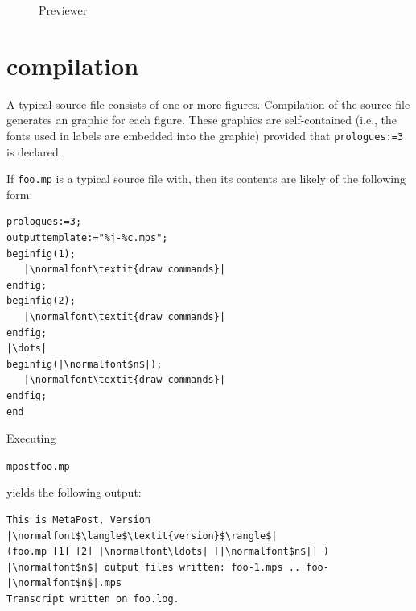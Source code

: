 \begin{figure}
	\begin{center}
		\caption{\MP{} Previewer}\label{fig:previewer}
	\end{center}
\end{figure}

\section{\MP{} compilation}
\label{sec:mpcompilation}

A typical \MP{} source file consists of one or more figures.
Compilation of the source file generates an \EPS{} graphic for each
figure.  These \EPS{} graphics are self-contained (i.e., the fonts used
in labels are embedded into the graphic) provided that
\lstinline{prologues:=3} is declared.

If \texttt{foo.mp} is a typical \MP{} source file with, then its
contents are likely of the following form:

\begin{lstlisting}[xleftmargin=1.25\parindent]
prologues:=3;
outputtemplate:="%j-%c.mps";
beginfig(1);
   |\normalfont\textit{draw commands}|
endfig;
beginfig(2);
   |\normalfont\textit{draw commands}|
endfig;
|\dots|
beginfig(|\normalfont$n$|);
   |\normalfont\textit{draw commands}|
endfig;
end
\end{lstlisting}

Executing
\begin{flushleft}
  \hspace*{1.25\parindent}\texttt{mpostfoo.mp}
\end{flushleft}
 yields the following output:

\begin{lstlisting}[xleftmargin=1.25\parindent]
This is MetaPost, Version |\normalfont$\langle$\textit{version}$\rangle$|
(foo.mp [1] [2] |\normalfont\ldots| [|\normalfont$n$|] )
|\normalfont$n$| output files written: foo-1.mps .. foo-|\normalfont$n$|.mps
Transcript written on foo.log.
\end{lstlisting}

